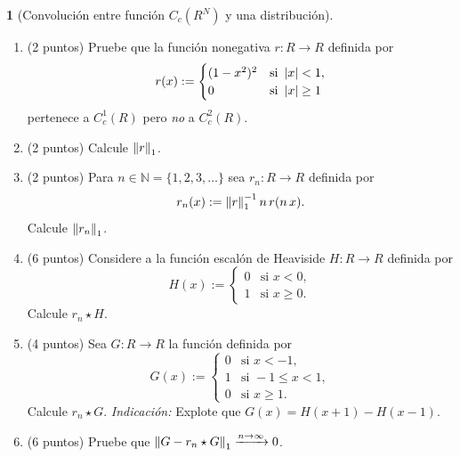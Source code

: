 \documentclass[10pt,a4paper]{report}
\renewcommand{\natural}{\mathbb{N}}
\newcommand{\abs}[2][y]{\if#1y\left\fi\lvert#2\if#1y\right\fi\rvert}
\newcommand{\norm}[2][y]{{\if#1y\left\fi\lVert#2\if#1y\right\fi\rVert}}
\newcommand{\Real}{R}
\theoremstyle{definition}
\newtheorem{problem}{\color{azul}{Problema}}
\renewcommand{\theproblem}{\Alph{problem}}
\numberwithin{equation}{problem}
\providecommand{\abs}[1]{\left\lvert#1\right\rvert}
\providecommand{\norm}[1]{\left\lVert#1\right\rVert}
\begin{document}
\begin{problem}[Convolución entre función $C_c(\Real^N)$ y una distribución]
    \begin{enumerate}[label=\textbf{\theproblem.\arabic{*}.},ref=\theproblem.\arabic{*},parsep=1ex]
    	\item\label{q:bumpRegularity} (2 puntos) Pruebe que la función nonegativa $r \colon R \to R$ definida por
    	\begin{equation*}
    		r(x) := \begin{cases}
    			(1-x^2)^2 & \text{si } \abs{x}<1,\\
    			0 & \text{si } \abs{x} \geq 1
    		\end{cases}
    	\end{equation*}
    	pertenece a $C^1_c(R)$ pero \emph{no} a $C^2_c(R)$.
    	\item\label{q:bumpNorm} (2 puntos) Calcule $\norm{r}_1$.
    	\item\label{q:scaledBumpNorm} (2 puntos) Para $n \in \natural = \{1, 2, 3, \dotsc \}$ sea $r_n \colon R \to R$ definida por
    	\begin{equation*}
    		r_n(x) := \norm{r}_1^{-1} \, n \, r(n \, x).
    	\end{equation*}
    	Calcule $\norm{r_n}_1$.
    	\item\label{q:convoHeaviside} (6 puntos) Considere a la función escalón de Heaviside $H \colon R \to R$ definida por
    	\begin{equation*}
    		H(x) := \begin{cases}
    			0 & \text{si } x < 0,\\
    			1 & \text{si } x \geq 0.
    		\end{cases}
    	\end{equation*}
    	Calcule $r_n \star H$.
    	\item\label{q:convoBox} (4 puntos) Sea $G \colon R \to R$ la función definida por
    	\begin{equation*}
    		G(x) := \begin{cases}
    			0 & \text{si } x<-1,\\
    			1 & \text{si } -1 \leq x < 1,\\
    			0 & \text{si } x \geq 1.
    		\end{cases}
    	\end{equation*}
    	Calcule $r_n \star G$.
    	\emph{Indicación:} Explote que $G(x) = H(x+1) - H(x-1)$.
    	\item\label{q:convoBoxApproximation} (6 puntos)
    	Pruebe que $\norm{G - r_n \star G}_1 \xrightarrow{n \to \infty} 0$.
    \end{enumerate}
	\end{problem}
\end{document}
